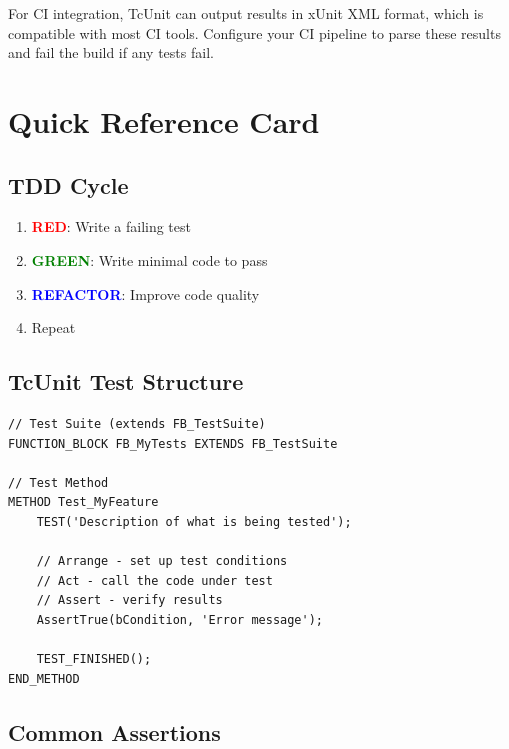 \documentclass[11pt,a4paper]{article}
\begin{document}
\begin{tipbox}
For CI integration, TcUnit can output results in xUnit XML format, which is compatible with most CI tools. Configure your CI pipeline to parse these results and fail the build if any tests fail.
\end{tipbox}

\section*{Quick Reference Card}

\subsection*{TDD Cycle}

\begin{enumerate}
    \item \textcolor{red}{\textbf{RED}}: Write a failing test
    \item \textcolor{green}{\textbf{GREEN}}: Write minimal code to pass
    \item \textcolor{blue}{\textbf{REFACTOR}}: Improve code quality
    \item Repeat
\end{enumerate}

\subsection*{TcUnit Test Structure}

\begin{lstlisting}
// Test Suite (extends FB_TestSuite)
FUNCTION_BLOCK FB_MyTests EXTENDS FB_TestSuite

// Test Method
METHOD Test_MyFeature
    TEST('Description of what is being tested');
    
    // Arrange - set up test conditions
    // Act - call the code under test
    // Assert - verify results
    AssertTrue(bCondition, 'Error message');
    
    TEST_FINISHED();
END_METHOD
\end{lstlisting}

\subsection*{Common Assertions}
\end{document}
